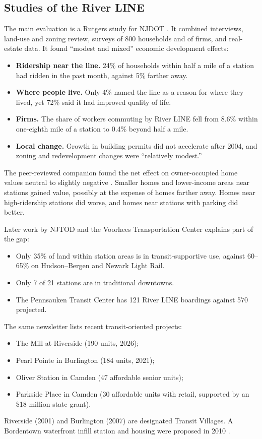\documentclass[11pt]{article}
\begin{document}
\subsection{Studies of the River LINE}
The main evaluation is a Rutgers study for NJDOT \citep{chatman2010}. It combined interviews, land-use and zoning review, surveys of 800 households and of firms, and real-estate data. It found ``modest and mixed'' economic development effects:
\begin{itemize}
\item \textbf{Ridership near the line.} 24\% of households within half a mile of a station had ridden in the past month, against 5\% farther away.
\item \textbf{Where people live.} Only 4\% named the line as a reason for where they lived, yet 72\% said it had improved quality of life.
\item \textbf{Firms.} The share of workers commuting by River LINE fell from 8.6\% within one-eighth mile of a station to 0.4\% beyond half a mile.
\item \textbf{Local change.} Growth in building permits did not accelerate after 2004, and zoning and redevelopment changes were ``relatively modest.''
\end{itemize}

The peer-reviewed companion found the net effect on owner-occupied home values neutral to slightly negative \citep{chatman2012}. Smaller homes and lower-income areas near stations gained value, possibly at the expense of homes farther away. Homes near high-ridership stations did worse, and homes near stations with parking did better.

Later work by NJTOD and the Voorhees Transportation Center \citep{njtod2026} explains part of the gap:
\begin{itemize}
\item Only 35\% of land within station areas is in transit-supportive use, against 60--65\% on Hudson--Bergen and Newark Light Rail.
\item Only 7 of 21 stations are in traditional downtowns.
\item The Pennsauken Transit Center has 121 River LINE boardings against 570 projected.
\end{itemize}
The same newsletter lists recent transit-oriented projects:
\begin{itemize}
\item The Mill at Riverside (190 units, 2026);
\item Pearl Pointe in Burlington (184 units, 2021);
\item Oliver Station in Camden (47 affordable senior units);
\item Parkside Place in Camden (30 affordable units with retail, supported by an \$18 million state grant).
\end{itemize}
Riverside (2001) and Burlington (2007) are designated Transit Villages. A Bordentown waterfront infill station and housing were proposed in 2010 \citep{njtod2010bordentown}.
\end{document}
